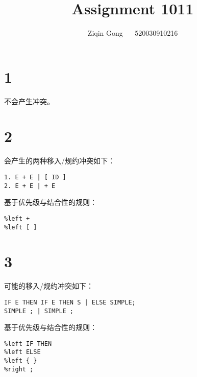 \documentclass[12pt]{article}
\title{Assignment 1011}
\author{Ziqin Gong $\quad$ 520030910216}
\date{}
\begin{document}
  \maketitle

  \section*{1}

    不会产生冲突。

  \section*{2}
  
    会产生的两种移入/规约冲突如下：
    \begin{lstlisting}
1. E + E | [ ID ]
2. E + E | + E
    \end{lstlisting}

    基于优先级与结合性的规则：
    \begin{lstlisting}
%left +
%left [ ]
    \end{lstlisting}

  \section*{3}
   
    可能的移入/规约冲突如下：
    \begin{lstlisting}
IF E THEN IF E THEN S | ELSE SIMPLE;
SIMPLE ; | SIMPLE ;
    \end{lstlisting}

    基于优先级与结合性的规则：
    \begin{lstlisting}
%left IF THEN
%left ELSE
%left { }
%right ;
    \end{lstlisting}
\end{document}
